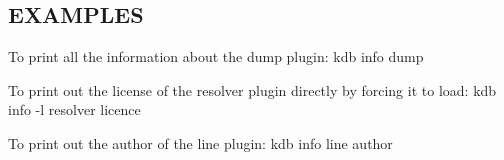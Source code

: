 \subsection*{E\+X\+A\+M\+P\+L\+E\+S}

To print all the information about the {\ttfamily dump} plugin\+: {\ttfamily kdb info dump}

To print out the license of the {\ttfamily resolver} plugin directly by forcing it to load\+: {\ttfamily kdb info -\/l resolver licence}

To print out the author of the {\ttfamily line} plugin\+: {\ttfamily kdb info line author} 